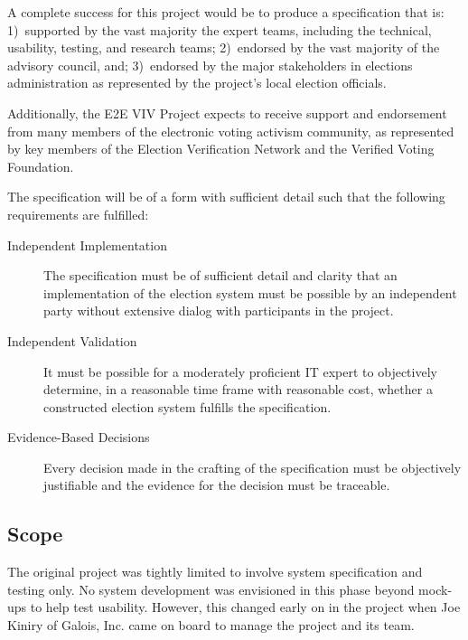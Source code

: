 A complete success for this project would be to produce a
specification that is: 1)~supported by the vast majority the expert
teams, including the technical, usability, testing, and research
teams; 2)~endorsed by the vast majority of the advisory council, and;
3)~endorsed by the major stakeholders in elections administration as
represented by the project's local election officials.

Additionally, the E2E VIV Project expects to receive support and
endorsement from many members of the electronic voting activism
community, as represented by key members of the Election Verification
Network and the Verified Voting Foundation.

The specification will be of a form with sufficient detail such that
the following requirements are fulfilled:
\begin{description}
\item[Independent Implementation] The specification must be of
  sufficient detail and clarity that an implementation of the election
  system must be possible by an independent party without extensive
  dialog with participants in the project.
\item[Independent Validation] It must be possible for a moderately
  proficient IT expert to objectively determine, in a reasonable time
  frame with reasonable cost, whether a constructed election system
  fulfills the specification.
\item[Evidence-Based Decisions] Every decision made in the crafting of
  the specification must be objectively justifiable and the evidence
  for the decision must be traceable.
\end{description}

\subsection{Scope}
\label{sec:scope}

The original project was tightly limited to involve system
specification and testing only. No system development was envisioned
in this phase beyond mock-ups to help test usability. However, this
changed early on in the project when Joe Kiniry of Galois, Inc. came
on board to manage the project and its team.

